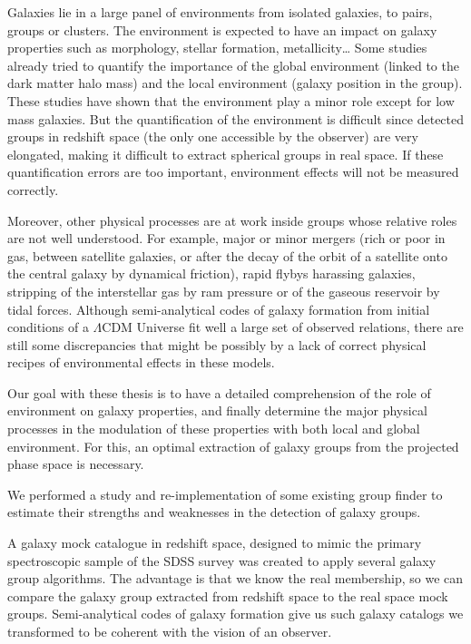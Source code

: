 %
\begin{bartabstract}
    \small

    Galaxies lie in a large panel of environments from isolated galaxies, to
    pairs, groups or clusters. The environment is expected to have an impact on
    galaxy properties such as morphology, stellar formation, metallicity\ldots
    Some studies already tried to quantify the importance of the global
    environment (linked to the dark matter halo mass) and the local environment
    (galaxy position in the group). These studies have shown that the
    environment play a minor role except for low mass galaxies. But the
    quantification of the environment is difficult since detected groups in
    redshift space (the only one accessible by the observer) are very
    elongated, making it difficult to extract spherical groups in real space.
    If these quantification errors are too important, environment effects will
    not be measured correctly.

    Moreover, other physical processes are at work inside groups whose relative
    roles are not well understood. For example, major or minor mergers (rich or
    poor in gas, between satellite galaxies, or after the decay of the orbit of
    a satellite onto the central galaxy by dynamical friction), rapid flybys
    harassing galaxies, stripping of the interstellar gas by ram pressure or of
    the gaseous reservoir by tidal forces. Although semi-analytical codes of
    galaxy formation from initial conditions of a $\Lambda$CDM Universe fit
    well a large set of observed relations, there are still some discrepancies
    that might be possibly by a lack of correct physical recipes of
    environmental effects in these models.

    Our goal with these thesis is to have a detailed comprehension of the role
    of environment on galaxy properties, and finally determine the major
    physical processes in the modulation of these properties with both local
    and global environment. For this, an optimal extraction of galaxy groups
    from the projected phase space is necessary.

    We performed a study and re-implementation of some existing group finder to
    estimate their strengths and weaknesses in the detection of galaxy groups.

    A galaxy mock catalogue in redshift space, designed to mimic the primary
    spectroscopic sample of the SDSS survey was created to apply several galaxy
    group algorithms. The advantage is that we know the real membership, so we
    can compare the galaxy group extracted from redshift space to the real
    space mock groups. Semi-analytical codes of galaxy formation give us such
    galaxy catalogs we transformed to be coherent with the vision of an
    observer.


\end{bartabstract}
